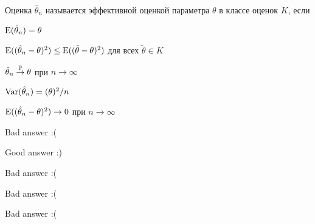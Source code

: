 
\begin{question}
Оценка \(\hat \theta_n\) называется эффективной оценкой параметра
\(\theta\) в классе оценок \(K\), если
\begin{answerlist}
  \item \(\E(\hat \theta_n)=\theta\)
  \item \(\E((\hat \theta_n - \theta)^2) \leq \E((\tilde \theta - \theta)^2)\)
для всех \(\tilde \theta \in K\)
  \item \(\hat \theta_n \stackrel{\P}{\to} \theta\) при
\(n\stackrel{}{\to} \infty\)
  \item \(\Var(\hat \theta_n)=(\theta)^2/n\)
  \item \(\E((\hat \theta_n - \theta)^2) \stackrel{}{\to} 0\) при
\(n\stackrel{}{\to} \infty\)
\end{answerlist}
\end{question}

\begin{solution}
\begin{answerlist}
  \item Bad answer :(
  \item Good answer :)
  \item Bad answer :(
  \item Bad answer :(
  \item Bad answer :(
\end{answerlist}
\end{solution}

